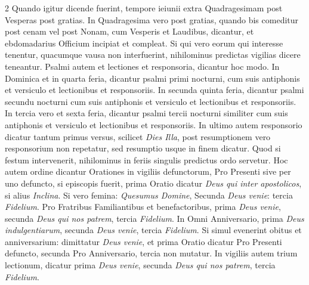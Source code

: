 \begin{multicols*}{2}
Quando igitur dicende fuerint, tempore ieiunii extra Quadragesimam post Vesperas post gratias. In Quadragesima vero post gratias, quando bis comeditur post cenam vel post Nonam, cum Vesperis et Laudibus, dicantur, et ebdomadarius Officium incipiat et compleat. Si qui vero eorum qui interesse tenentur, quacumque vausa non interfuerint, nihilominus predictas vigilias dicere teneantur. Psalmi autem et lectiones et responsoria, dicantur hoc modo.
In Dominica et in quarta feria, dicantur psalmi primi nocturni, cum suis antiphonis et versiculo et lectionibus et responsoriis. In secunda quinta feria, dicantur psalmi secundu nocturni cum suis antiphonis et versiculo et lectionibus et responsoriis. In tercia vero et sexta feria, dicantur psalmi tercii nocturni similiter cum suis antiphonis et versiculo et lectionibus et responsoriis. In ultimo autem responsorio dicatur tantum primus versus, scilicet \textit{Dies Illa}, post resumptionem vero responsorium non repetatur, sed resumptio usque in finem dicatur. Quod si festum intervenerit, nihilominus in feriis singulis predictus ordo servetur. %
Hoc autem ordine dicantur Orationes in vigiliis defunctorum, Pro Presenti sive per uno defuncto, si episcopis fuerit, prima Oratio dicatur \textit{Deus qui inter apostolicos}, si alius \textit{Inclina}. Si vero femina: \textit{Quesumus Domine}, Secunda \textit{Deus venie}: tercia \textit{Fidelium}. Pro Fratribus Familiantibus et benefactoribus, prima \textit{Deus venie}, secunda \textit{Deus qui nos patrem}, tercia \textit{Fidelium}.
In Omni Anniversario, prima \textit{Deus indulgentiarum}, secunda \textit{Deus venie}, tercia \textit{Fidelium}. Si simul evenerint obitus et anniversarium: dimittatur \textit{Deus venie}, et prima Oratio dicatur Pro Presenti defuncto, secunda Pro Anniversario, tercia non mutatur. In vigiliis autem trium lectionum, dicatur prima \textit{Deus venie}, secunda \textit{Deus qui nos patrem}, tercia \textit{Fidelium}.


\end{multicols*}
